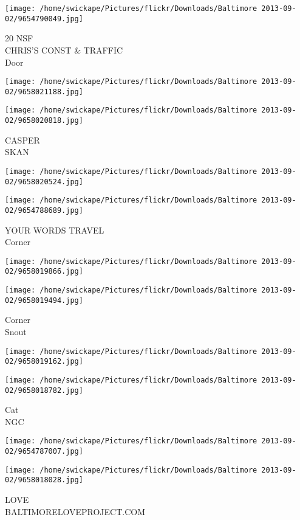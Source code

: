 \documentclass[10pt,letterpaper]{article}
\begin{document}
\texttt{[image: /home/swickape/Pictures/flickr/Downloads/Baltimore 2013-09-02/9654790049.jpg]}

20 NSF\\
CHRIS'S CONST \& TRAFFIC\\
Door
\pagebreak

\texttt{[image: /home/swickape/Pictures/flickr/Downloads/Baltimore 2013-09-02/9658021188.jpg]}

\vspace{0.25in}
\texttt{[image: /home/swickape/Pictures/flickr/Downloads/Baltimore 2013-09-02/9658020818.jpg]}

CASPER\\
SKAN
\pagebreak

\texttt{[image: /home/swickape/Pictures/flickr/Downloads/Baltimore 2013-09-02/9658020524.jpg]}

\vspace{0.25in}
\texttt{[image: /home/swickape/Pictures/flickr/Downloads/Baltimore 2013-09-02/9654788689.jpg]}

YOUR WORDS TRAVEL\\
Corner
\pagebreak

\texttt{[image: /home/swickape/Pictures/flickr/Downloads/Baltimore 2013-09-02/9658019866.jpg]}

\vspace{0.25in}
\texttt{[image: /home/swickape/Pictures/flickr/Downloads/Baltimore 2013-09-02/9658019494.jpg]}

Corner\\
Snout
\pagebreak

\texttt{[image: /home/swickape/Pictures/flickr/Downloads/Baltimore 2013-09-02/9658019162.jpg]}

\vspace{0.25in}
\texttt{[image: /home/swickape/Pictures/flickr/Downloads/Baltimore 2013-09-02/9658018782.jpg]}

Cat\\
NGC
\pagebreak

\texttt{[image: /home/swickape/Pictures/flickr/Downloads/Baltimore 2013-09-02/9654787007.jpg]}

\vspace{0.25in}
\texttt{[image: /home/swickape/Pictures/flickr/Downloads/Baltimore 2013-09-02/9658018028.jpg]}

LOVE\\
BALTIMORELOVEPROJECT.COM
\pagebreak
\end{document}
